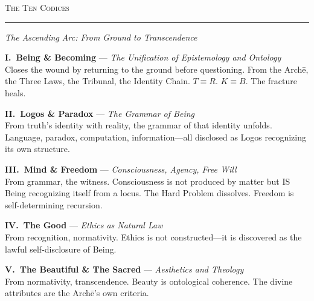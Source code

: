 \documentclass[10pt, openany, oneside]{book}
\renewcommand{\large}{\fontsize{11.5}{14}\selectfont}
\newcommand{\separator}{%
    \begin{center}
        \vspace{0.3em}
        \rule{0.3\textwidth}{0.4pt}
        \vspace{0.3em}
    \end{center}
}
\begin{document}
\vspace{1.5em}

\begin{center}
    {\large\scshape The Ten Codices}
\end{center}
\separator

\vspace{0.3em}

\begin{center}
    \itshape The Ascending Arc: From Ground to Transcendence
\end{center}

\vspace{0.5em}

\noindent \textbf{I.\ Being \& Becoming} --- \textit{The Unification of Epistemology and Ontology}\\
Closes the wound by returning to the ground before questioning. From the Arch\={e}, the Three Laws, the Tribunal, the Identity Chain. $T \equiv R$. $K \equiv B$. The fracture heals.

\vspace{0.5em}

\noindent \textbf{II.\ Logos \& Paradox} --- \textit{The Grammar of Being}\\
From truth's identity with reality, the grammar of that identity unfolds. Language, paradox, computation, information---all disclosed as Logos recognizing its own structure.

\vspace{0.5em}

\noindent \textbf{III.\ Mind \& Freedom} --- \textit{Consciousness, Agency, Free Will}\\
From grammar, the witness. Consciousness is not produced by matter but IS Being recognizing itself from a locus. The Hard Problem dissolves. Freedom is self-determining recursion.

\vspace{0.5em}

\noindent \textbf{IV.\ The Good} --- \textit{Ethics as Natural Law}\\
From recognition, normativity. Ethics is not constructed---it is discovered as the lawful self-disclosure of Being.

\vspace{0.5em}

\noindent \textbf{V.\ The Beautiful \& The Sacred} --- \textit{Aesthetics and Theology}\\
From normativity, transcendence. Beauty is ontological coherence. The divine attributes are the Arch\={e}'s own criteria.
\end{document}
